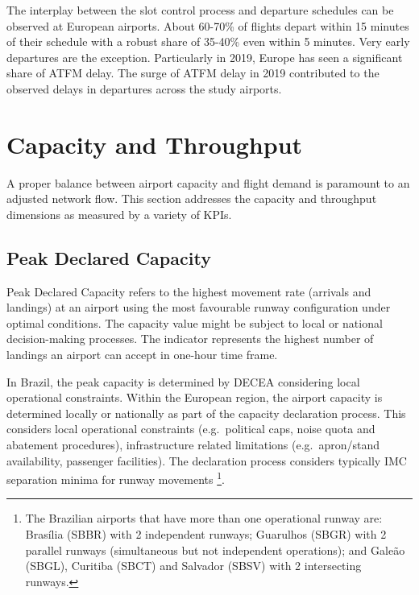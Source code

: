 \documentclass[
]{book}
\begin{document}
The interplay between the slot control process and departure schedules can be observed at European airports. About 60-70\% of flights depart within 15 minutes of their schedule with a robust share of 35-40\% even within 5 minutes. Very early departures are the exception.
Particularly in 2019, Europe has seen a significant share of ATFM delay.
The surge of ATFM delay in 2019 contributed to the observed delays in departures across the study airports.

\hypertarget{capacity-and-throughput}{%
\chapter{Capacity and Throughput}\label{capacity-and-throughput}}

A proper balance between airport capacity and flight demand is paramount to an adjusted network flow. This section addresses the capacity and throughput dimensions as measured by a variety of KPIs.

\hypertarget{peak-declared-capacity}{%
\section{Peak Declared Capacity}\label{peak-declared-capacity}}

Peak Declared Capacity refers to the highest movement rate (arrivals and landings) at an airport using the most favourable runway configuration under optimal conditions.
The capacity value might be subject to local or national decision-making processes.
The indicator represents the highest number of landings an airport can accept in one-hour time frame.

In Brazil, the peak capacity is determined by DECEA considering local operational constraints.
Within the European region, the airport capacity is determined locally or nationally as part of the capacity declaration process. This considers local operational constraints (e.g.~political caps, noise quota and abatement procedures), infrastructure related limitations (e.g.~apron/stand availability, passenger facilities). The declaration process considers typically IMC separation minima for runway movements \footnote{The Brazilian airports that have more than one operational runway are: Brasília (SBBR) with 2 independent runways; Guarulhos (SBGR) with 2 parallel runways (simultaneous but not independent operations); and Galeão (SBGL), Curitiba (SBCT) and Salvador (SBSV) with 2 intersecting runways.}.
\end{document}
